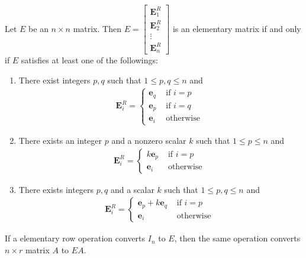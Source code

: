 \noindent Let $E$ be an $n \times n$ matrix. Then $E = \begin{bmatrix}
\textbf{E}^R_1 \\ \textbf{E}^R_2 \\ \vdots \\ \textbf{E}^R_n
\end{bmatrix}$ is an elementary matrix if and only if $E$ satisfies at least one of the followings:
\begin{enumerate}
	\item There exist integers $p, q$ such that $1 \le p, q \le n$ and \begin{align*}
	\textbf{E}^R_i = \begin{cases}
	\textbf{e}_q &\mbox{ if } i=p \\
	\textbf{e}_p &\mbox{ if } i=q \\
	\textbf{e}_i &\mbox{ otherwise } 
	\end{cases}
	\end{align*}
	\item There exists an integer $p$ and a nonzero scalar $k$ such that $1 \le p \le n$ and
	\begin{align*}
	\textbf{E}^R_i = \begin{cases}
	k\textbf{e}_p &\mbox{ if } i=p \\
	\textbf{e}_i &\mbox{ otherwise }
	\end{cases}
	\end{align*}
	\item There exists integers $p, q$ and a scalar $k$ such that $1 \le p, q \le n$ and \begin{align*}
	\textbf{E}^R_i = \begin{cases}
	\textbf{e}_p + k\textbf{e}_q &\mbox{ if } i=p \\
	\textbf{e}_i &\mbox{ otherwise }
	\end{cases}
	\end{align*}
\end{enumerate}

\begin{theorem}
	If a elementary row operation converts $I_n$ to $E$, then the same operation converts $n \times r$ matrix $A$ to $EA$.
\end{theorem}

